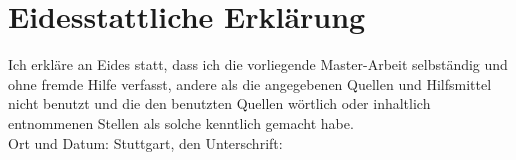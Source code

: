 \chapter*{Eidesstattliche Erklärung}
Ich erkläre an Eides statt, dass ich die vorliegende Master-Arbeit selbständig und ohne fremde Hilfe verfasst, andere als die angegebenen Quellen und Hilfsmittel nicht benutzt und die den benutzten Quellen wörtlich oder inhaltlich entnommenen Stellen als solche kenntlich gemacht habe.
\\[2.5cm]
Ort und Datum: Stuttgart, den \hrulefill\enspace Unterschrift: \hrulefill